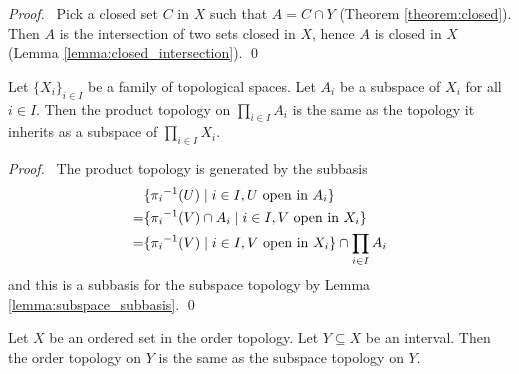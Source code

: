 \begin{proof}
    \pf\ Pick a closed set $C$ in $X$ such that $A = C \cap Y$ (Theorem \ref{theorem:closed}). Then
    $A$ is the intersection of two sets closed in $X$, hence $A$ is closed in $X$ (Lemma \ref{lemma:closed_intersection}). \qed
\end{proof}

\begin{theorem}
    Let $\{ X_i \}_{i \in I}$ be a family of topological spaces. Let $A_i$ be a subspace of $X_i$ for all $i \in I$.
    Then the product topology on $\prod_{i \in I} A_i$ is the same as the topology it inherits as a subspace of
    $\prod_{i \in I} X_i$.
\end{theorem}

\begin{proof}
    \pf\ The product topology is generated by the subbasis
    \begin{align*}
        & \{ {\pi_i}^{-1}(U) \mid i \in I, U \text{ open in } A_i \} \\
        = & \{ {\pi_i}^{-1}(V) \cap A_i \mid i \in I, V \text{ open in } X_i \} \\
        = & \{ {\pi_i}^{-1}(V) \mid i \in I, V \text{ open in } X_i \} \cap \prod_{i \in I} A_i
    \end{align*}
    and this is a subbasis for the subspace topology by Lemma \ref{lemma:subspace_subbasis}. \qed
\end{proof}

\begin{theorem}
    Let $X$ be an ordered set in the order topology. Let $Y \subseteq X$ be an interval. Then the order topology
    on $Y$ is the same as the subspace topology on $Y$.
\end{theorem}


